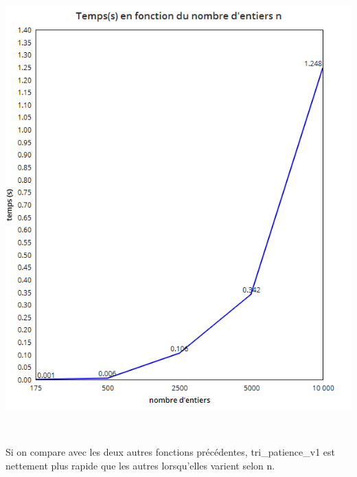 \documentclass[a4paper, 12pt]{article}
\begin{document}
\begin{center}
\includegraphics[scale=0.25]{tripat1N.png}
\end{center}
~

Si on compare avec les deux autres fonctions précédentes, tri\_patience\_v1 est nettement plus rapide que les autres lorsqu'elles varient selon n.

~
\end{document}
